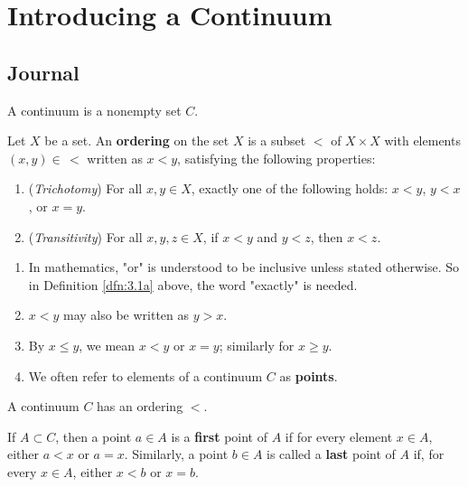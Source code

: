 \documentclass[../main.tex]{subfiles}
\begin{document}
\chapter{Introducing a Continuum}
\section{Journal}
\begin{axiom}\label{axm:3.1}
    A continuum is a nonempty set $C$.
\end{axiom}

\begin{definition}\label{dfn:3.1}
    Let $X$ be a set. An \textbf{ordering} on the set $X$ is a subset $<$ of $X\times X$ with elements $(x,y)\in\, <$ written as $x<y$, satisfying the following properties:
    \begin{enumerate}[label={\alph*)},ref={\thetheorem\alph*}]
        \item \label{dfn:3.1a}(\emph{Trichotomy}) For all $x,y\in X$, exactly one of the following holds: $x<y$, $y<x$, or $x=y$.
        \item \label{dfn:3.1b}(\emph{Transitivity}) For all $x,y,z\in X$, if $x<y$ and $y<z$, then $x<z$.
    \end{enumerate}
\end{definition}

\begin{remark}\label{rmk:3.2}\leavevmode
    \begin{enumerate}[label={\alph*)}]
        \item In mathematics, "or" is understood to be inclusive unless stated otherwise. So in Definition \ref{dfn:3.1a} above, the word "exactly" is needed.
        \item $x<y$ may also be written as $y>x$.
        \item By $x\leq y$, we mean $x<y$ or $x=y$; similarly for $x\geq y$.
        \item We often refer to elements of a continuum $C$ as \textbf{points}.
    \end{enumerate}
\end{remark}

\begin{axiom}\label{axm:3.2}
    A continuum $C$ has an ordering $<$.
\end{axiom}

\begin{definition}\label{dfn:3.3}
    If $A\subset C$, then a point $a\in A$ is a \textbf{first} point of $A$ if for every element $x\in A$, either $a<x$ or $a=x$. Similarly, a point $b\in A$ is called a \textbf{last} point of $A$ if, for every $x\in A$, either $x<b$ or $x=b$.
\end{definition}
\end{document}
